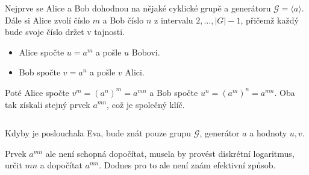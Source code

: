 \documentclass[10pt,a4paper]{article}
\begin{document}
Nejprve se Alice a Bob dohodnou na nějaké cyklické grupě a generátoru $\mathcal{G}=\langle a \rangle$. 
Dále si Alice zvolí číslo $m$ a Bob číslo $n$ z intervalu $2, \dots, |G|-1$, přičemž každý bude svoje číslo držet v tajnosti.

\begin{itemize}
    \item Alice spočte $u=a^m$ a pošle $u$ Bobovi. 
    \item Bob spočte $v=a^n$ a pošle $v$ Alici. 
\end{itemize}

Poté Alice spočte $v^m=(a^n)^m=a^{mn}$ a Bob spočte $u^n = (a^m)^n=a^{mn}$. 
Oba tak získali stejný prvek $a^{mn}$, což je společný klíč.

$ $

Kdyby je poslouchala Eva, bude znát pouze grupu $\mathcal{G}$, generátor $a$ a hodnoty $u,v$. 

Prvek $a^{mn}$ ale není schopná dopočítat, musela by provést diskrétní logaritmus, určit $mn$ a dopočítat $a^{mn}$.
Dodnes pro to ale není znám efektivní způsob.
\end{document}

